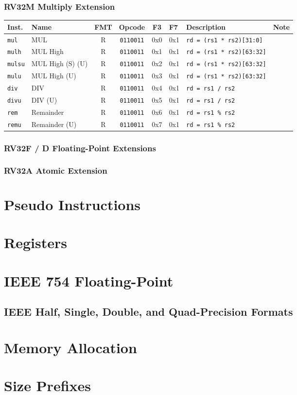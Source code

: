 \documentclass{article}
\newcommand{\code}[1]{\texttt{#1}}
\begin{document}
\subsubsection*{RV32M Multiply Extension}
\begin{tabular}
{l | l | c | c | c | l | l | l }
Inst.       & Name              & FMT   & Opcode         & F3  & F7  & Description                     & Note\\ \hline
\code{mul}  & MUL               & R     & \code{0110011} & 0x0 & 0x1 & \code{rd = (rs1 * rs2)[31:0]}   & \\
\code{mulh} & MUL High          & R     & \code{0110011} & 0x1 & 0x1 & \code{rd = (rs1 * rs2)[63:32]}  & \\
\code{mulsu}& MUL High (S) (U)  & R     & \code{0110011} & 0x2 & 0x1 & \code{rd = (rs1 * rs2)[63:32]}  & \\
\code{mulu} & MUL High (U)      & R     & \code{0110011} & 0x3 & 0x1 & \code{rd = (rs1 * rs2)[63:32]}  & \\
\code{div}  & DIV               & R     & \code{0110011} & 0x4 & 0x1 & \code{rd = rs1 / rs2}           & \\
\code{divu} & DIV (U)           & R     & \code{0110011} & 0x5 & 0x1 & \code{rd = rs1 / rs2}           & \\
\code{rem}  & Remainder         & R     & \code{0110011} & 0x6 & 0x1 & \code{rd = rs1 \% rs2}          & \\
\code{remu} & Remainder (U)     & R     & \code{0110011} & 0x7 & 0x1 & \code{rd = rs1 \% rs2}          & \\
\end{tabular}

\subsubsection*{RV32F / D Floating-Point Extensions}

\subsubsection*{RV32A Atomic Extension}

\section*{Pseudo Instructions}

\section*{Registers}

\section*{IEEE 754 Floating-Point}

\subsection*{IEEE Half, Single, Double, and Quad-Precision Formats}

\section*{Memory Allocation}

\section*{Size Prefixes}
\end{document}
